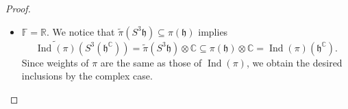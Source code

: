 \documentclass[10pt,a4paper]{amsart}
\DeclareMathOperator{\Ind}{Ind}
\newcommand{\CC}{\mathbb{C}} %
\newcommand{\FF}{\mathbb{F}} %
\newcommand{\RR}{\mathbb{R}} %
\newcommand{\tp}{{\scriptscriptstyle\mathsf{T}}}
\begin{document}
\begin{proof}
\begin{itemize}
\[
c_{js}^3 = c_{js},\quad c_{js}^2 c_{ks} = 0,\quad 1 \le s \le m-n,\; 1 \le j < k \le n.
\]
Therefore,  $c_{js} \in \{0,-1,1\}$ for all $1 \le s \le m-n$ and $1 \le j  \le n$.  Moreover,  for each $1 \le s \le m-n$ there is at most one $1 \le j \le n$ such that $c_{js} \ne 0$.  By \eqref{prop: Gauss elimination:eq1},  we derive that $A = \omega B'$ where $B' \in \{0,\pm 1\}^{n \times \dim (\mathbb{V})}$.  By construction,  we clearly have $\omega = (\lambda_1,\dots,  \lambda_n)^\tp$ and this completes the proof.
\item[$\diamond$] $\FF=\RR$.  We notice that $        \widetilde{\pi} \left( S^3 \mathfrak{h} \right) \subseteq  \pi \left( \mathfrak{h} \right) $ implies 
\[
\widetilde{\Ind(\pi)} \left( S^3 (\mathfrak{h}^{\CC}) \right) = \widetilde{\pi} \left( S^3 \mathfrak{h} \right)\otimes \mathbb{C} \subseteq \pi \left( \mathfrak{h} \right) \otimes \CC = \Ind( \pi)\left( \mathfrak{h}^{\CC}\right).
\]
Since weights of $\pi$ are the same as those of $\Ind(\pi)$,  we obtain the desired inclusions by the complex case.  \qedhere
\end{itemize}
\end{proof}
\end{document}
